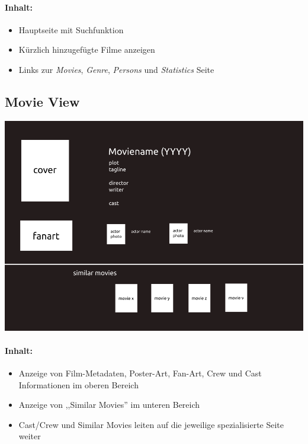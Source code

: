 \paragraph{Inhalt:}
\begin{itemize}
    \item Hauptseite mit Suchfunktion
    \item Kürzlich hinzugefügte Filme anzeigen
    \item Links zur \emph{Movies}, \emph{Genre}, \emph{Persons} und \emph{Statistics} Seite
\end{itemize}

\subsection{Movie View}
\includegraphics[width=\textwidth]{../pics/movieview}
\paragraph{Inhalt:}
\begin{itemize}
    \item Anzeige von Film-Metadaten, Poster-Art, Fan-Art, Crew und Cast Informationen im oberen Bereich
    \item Anzeige von ,,Similar Movies'' im unteren Bereich
    \item Cast/Crew und Similar Movies leiten auf die jeweilige spezialisierte Seite weiter
\end{itemize}

